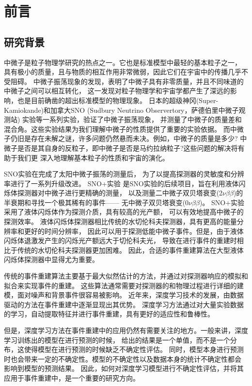 \chapter{前言}

\section{研究背景}

中微子是粒子物理学研究的热点之一。它也是标准模型中最轻的基本粒子之一，
具有极小的质量，且与物质的相互作用非常微弱，因此它们在宇宙中的传播几乎不受阻碍。
中微子振荡现象的发现，表明了中微子具有非零质量，并且不同味道的中微子之间可以相互转化，
这一发现对粒子物理学和宇宙学都产生了深远的影响，也是目前确凿的超出标准模型的物理现象。
日本的超级神冈(Super-Kamiokande)和加拿大SNO (Sudbury Neutrino Observertory，萨德伯里中微子观测站) 
实验等一系列实验，验证了中微子振荡现象\cite{PhysRevLett.87.071301}\cite{PhysRevLett.81.1562}，
并测量了中微子的质量差和混合角。这些实验结果为我们理解中微子的性质提供了重要的实验依据。
而中微子仍旧是存在未解之谜，许多问题仍然悬而未决。例如，中微子的质量是多少?
中微子是否是其自身的反粒子，即中微子是否是马约拉纳粒子?这些问题的解决将有助于我们更
深入地理解基本粒子的性质和宇宙的演化。

SNO实验在完成了太阳中微子振荡的测量后，
为了以提高探测器的灵敏度和分辨率进行了一系列升级改进。
SNO+实验\cite{andringa2016current}\cite{albanese2021sno+}
是SNO实验的后续项目，旨在利用液体闪烁体探测器对中微子进行更精确的测量，
以及测量二中微子双贝塔衰变(2$\nu\beta\beta$)的半衰期和寻找一个极其稀有的事件——
无中微子双贝塔衰变(0$\nu\beta\beta$)\cite{albanese2021sno+}。
SNO+实验采用了液体闪烁体作为探测介质，具有较高的光产额，
可以有效地提高中微子的探测效率。
液体闪烁体探测器相比传统的水切伦科夫探测器，具有更高的能量分辨率和更好的时间分辨率，
因此可以用于探测低能中微子事件。但是，由于液体闪烁体退激发产生的闪烁光产额远大于切伦科夫光，
导致在进行事件的重建时相比于传统的水切伦科夫探测器更加困难。
因此，合适的事件重建算法在大型液体闪烁体探测器中显得尤为重要。

传统的事件重建算法主要基于最大似然估计的方法，并通过对探测器响应的模拟和拟合来实现事件的重建。
这些算法通常需要对探测器的和物理过程进行详细的建模，面对噪声和背景事件很容易被影响。
近年来，深度学习技术的发展，由数据驱动的方法在事件重建中逐渐显现出其优势。
深度学习方法通过对大量实验数据的学习，自动提取特征并进行事件重建，具有更好的适应性和鲁棒性。

但是，深度学习方法在事件重建中的应用仍然有需要关注的地方。一般来讲，深度学习训练出的模型在进行预测的时候，
给出的结果是一个单值，而不是一个分布，这使得模型在进行预测的时候缺乏不确定性评估。
同时，模型本身进行预测时也会带来一定的不确定性。模型的不确定性以及数据本身的统计不确定性都会
影响到模型的预测结果。
因此，如何对深度学习模型进行不确定性评估，并将其应用于事件重建中，是一个重要的研究方向。


